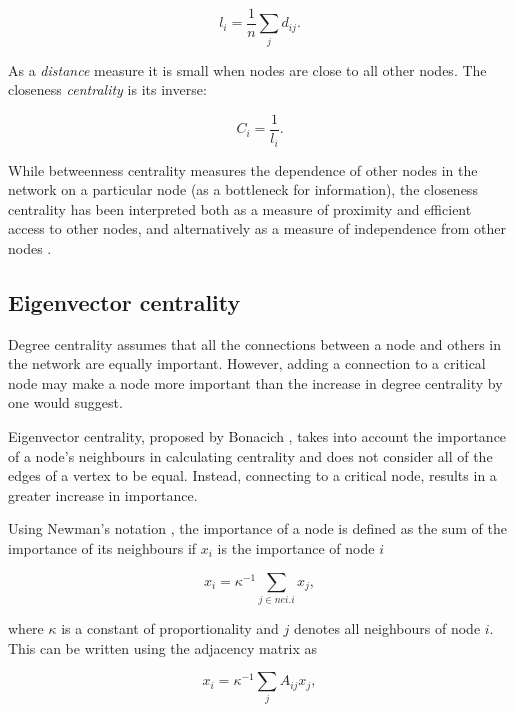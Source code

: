 \begin{equation}
    l_i = \frac{1}{n} \sum_j d_{ij}.
\end{equation}

 As a \textit{distance} measure it is small when nodes are close to all other nodes. The closeness \textit{centrality} is its inverse:


\begin{equation}
    C_i = \frac{1}{l_i}.
\end{equation}
\cite{newman2018networks}

While betweenness centrality measures the dependence of other nodes in the network on a particular node (as a bottleneck for information), the closeness centrality has been interpreted both as a measure of proximity and efficient access to other nodes, and alternatively as a measure of independence from other nodes \cite{brandes2016maintaining}.


\subsection{Eigenvector centrality}
\label{sec:explain eigenvcentrality}
Degree centrality assumes that all the connections between a node and others in the network are equally important.  However, adding a connection to a critical node may make a node more important than the increase in degree centrality by one would suggest. 

Eigenvector centrality, proposed by Bonacich \cite{bonacich1972factoring}, takes into account the importance of a node's neighbours in calculating centrality and does not consider all of the edges of a vertex to be equal. Instead, connecting to a critical node, results in a greater increase in importance. 

Using Newman's notation \cite{newman2018networks}, the importance of a node is defined as the sum of the importance of its neighbours if $x_i$ is the importance of node $i$

\begin{equation}
    x_i = \kappa^{-1} \sum_{j\in nei. i} x_j,
\end{equation}

where $\kappa$ is a constant of proportionality and $j$ denotes all neighbours of node $i$. This can be written using the adjacency matrix as

\begin{equation}
    x_i = \kappa^{-1} \sum_j A_{ij} x_j,
\end{equation}

